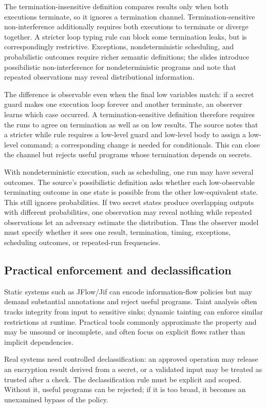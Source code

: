 \documentclass[11pt,a4paper]{article}
\numberwithin{figure}{section}
\begin{document}
The termination-insensitive definition compares results only when both executions terminate, so it ignores a termination channel. Termination-sensitive non-interference additionally requires both executions to terminate or diverge together. A stricter loop typing rule can block some termination leaks, but is correspondingly restrictive. Exceptions, nondeterministic scheduling, and probabilistic outcomes require richer semantic definitions; the slides introduce possibilistic non-interference for nondeterministic programs and note that repeated observations may reveal distributional information.

The difference is observable even when the final low variables match: if a secret guard makes one execution loop forever and another terminate, an observer learns which case occurred. A termination-sensitive definition therefore requires the runs to agree on termination as well as on low results. The source notes that a stricter while rule requires a low-level guard and low-level body to assign a low-level command; a corresponding change is needed for conditionals. This can close the channel but rejects useful programs whose termination depends on secrets.

With nondeterministic execution, such as scheduling, one run may have several outcomes. The source's possibilistic definition asks whether each low-observable terminating outcome in one state is possible from the other low-equivalent state. This still ignores probabilities. If two secret states produce overlapping outputs with different probabilities, one observation may reveal nothing while repeated observations let an adversary estimate the distribution. Thus the observer model must specify whether it sees one result, termination, timing, exceptions, scheduling outcomes, or repeated-run frequencies.

\subsection{Practical enforcement and declassification}
Static systems such as JFlow/Jif can encode information-flow policies but may demand substantial annotations and reject useful programs. Taint analysis often tracks integrity from input to sensitive sinks; dynamic tainting can enforce similar restrictions at runtime. Practical tools commonly approximate the property and may be unsound or incomplete, and often focus on explicit flows rather than implicit dependencies.

Real systems need controlled declassification: an approved operation may release an encryption result derived from a secret, or a validated input may be treated as trusted after a check. The declassification rule must be explicit and scoped. Without it, useful programs can be rejected; if it is too broad, it becomes an unexamined bypass of the policy.
\end{document}
